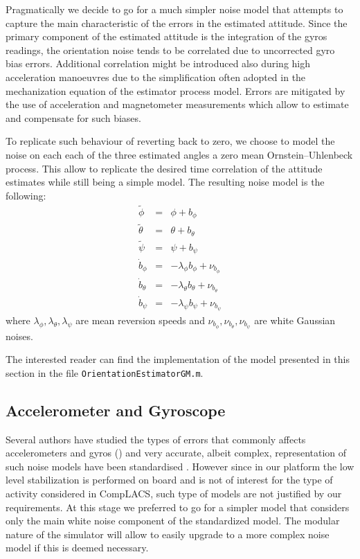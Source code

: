 \documentclass[a4paper,11pt]{report}
\begin{document}
Pragmatically we decide to go for a much simpler noise model that attempts to capture the main characteristic of the errors in the estimated attitude. 
Since the primary component of the estimated attitude is the integration of the gyros readings, the orientation noise tends to be correlated due to uncorrected gyro bias errors. 
Additional correlation might be introduced also during high acceleration manoeuvres due to the simplification often adopted in the mechanization equation of the estimator process model.
Errors are mitigated by the use of acceleration and magnetometer measurements which allow to estimate and compensate for such biases.

To replicate such behaviour of reverting back to zero, we choose to model the noise on each each of the three estimated angles a zero mean Ornstein–Uhlenbeck process. This allow to replicate the desired time correlation of the attitude estimates while still being a simple model. The resulting noise model is the following:
\begin{eqnarray}
  \tilde{\phi} &=& \phi + b_\phi\\
  \tilde{\theta} &=& \theta + b_\theta\\
  \tilde{\psi} &=& \psi + b_\psi \\
  \dot{b}_\phi &= &  - \lambda_\phi b_\phi + \nu_{b_\phi}\\
  \dot{b}_\theta &= &  - \lambda_\theta b_\theta + \nu_{b_\theta}\\
  \dot{b}_\psi &= &  - \lambda_\psi b_\psi + \nu_{b_\psi}
\end{eqnarray}
where $\lambda_\phi,\lambda_\theta,\lambda_\psi$ are mean reversion speeds and  $\nu_{b_\phi},\nu_{b_\theta},\nu_{b_\psi}$ are white Gaussian noises.

The interested reader can find the implementation of the model presented in this section in the file \texttt{OrientationEstimatorGM.m}. 

\subsection{Accelerometer and Gyroscope}

Several authors have studied the types of errors that commonly affects accelerometers and gyros (\cite{han2011quantization}\cite{hou2003inertial}) and very accurate, albeit complex, representation of such noise models have been standardised \cite{ieee2006standard}. However since in our platform the low level stabilization is performed on board and is not of interest for the type of activity considered in CompLACS, such type of models are not justified by our requirements. 
At this stage we preferred to go for a simpler model that considers only the main white noise component of the standardized model. The modular nature of the simulator will allow to easily upgrade to a more complex noise model if this is deemed necessary.
\end{document}
